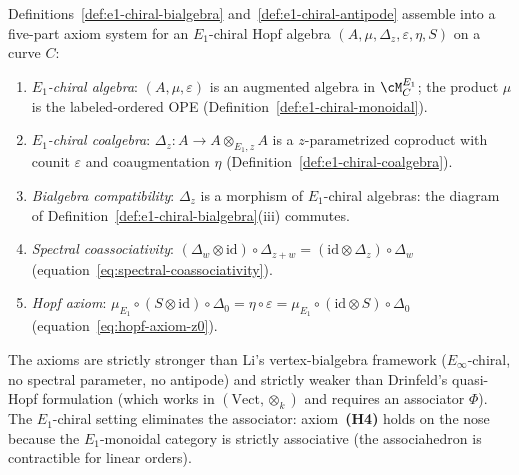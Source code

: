 \begin{remark}
\label{rem:e1-hopf-axiom-summary}
Definitions~\ref{def:e1-chiral-bialgebra}
and~\ref{def:e1-chiral-antipode} assemble into a five-part axiom
system for an $E_1$-chiral Hopf algebra
$(A, \mu, \Delta_z, \varepsilon, \eta, S)$ on a curve $C$:
\begin{enumerate}[label=\textbf{(H\arabic*)}]
 \item \emph{$E_1$-chiral algebra}: $(A, \mu, \varepsilon)$ is an
 augmented algebra in $\cM^{E_1}_C$; the product $\mu$ is the
 labeled-ordered OPE (Definition~\ref{def:e1-chiral-monoidal}).
 \item \emph{$E_1$-chiral coalgebra}: $\Delta_z \colon A \to
 A \otimes_{E_1,z} A$ is a $z$-parametrized coproduct with counit
 $\varepsilon$ and coaugmentation $\eta$
 (Definition~\ref{def:e1-chiral-coalgebra}).
 \item \emph{Bialgebra compatibility}: $\Delta_z$ is a morphism
 of $E_1$-chiral algebras: the diagram of
 Definition~\ref{def:e1-chiral-bialgebra}(iii) commutes.
 \item \emph{Spectral coassociativity}:
 $(\Delta_w \otimes \mathrm{id}) \circ \Delta_{z+w}
 = (\mathrm{id} \otimes \Delta_z) \circ \Delta_w$
 (equation~\eqref{eq:spectral-coassociativity}).
 \item \emph{Hopf axiom}:
 $\mu_{E_1} \circ (S \otimes \mathrm{id}) \circ \Delta_0
 = \eta \circ \varepsilon
 = \mu_{E_1} \circ (\mathrm{id} \otimes S) \circ \Delta_0$
 (equation~\eqref{eq:hopf-axiom-z0}).
\end{enumerate}
The axioms are strictly stronger than Li's vertex-bialgebra
framework ($E_\infty$-chiral, no spectral parameter, no
antipode) and strictly weaker than Drinfeld's quasi-Hopf formulation
(which works in $({\mathrm{Vect}}, \otimes_k)$ and requires an
associator $\Phi$). The $E_1$-chiral setting eliminates the
associator: axiom~\textbf{(H4)} holds on the nose because
the $E_1$-monoidal category is strictly associative
(the associahedron is contractible for linear orders).


\end{remark}
